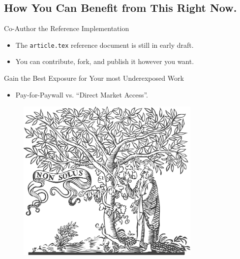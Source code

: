 		\subsection{How You Can Benefit from This Right Now.}
			\begin{frame}{Co-Author the Reference Implementation}
				\begin{itemize}
					\item The \colorbox{tlg}{\texttt{article.tex}} reference document is still in early draft.
					\item You can contribute, fork, and publish it however you want.
				\end{itemize}
			\end{frame}
			\begin{frame}{Gain the Best Exposure for Your most Underexposed Work}
				\begin{itemize}
					\item Pay-for-Paywall vs. “Direct Market Access”.
				\end{itemize}
				\begin{minipage}{0.49\textwidth}
					\begin{figure}
						\centering
						\includegraphics[width=0.8\textwidth]{img/elsevier.pdf}
					\end{figure}
				\end{minipage}
			\end{frame}
